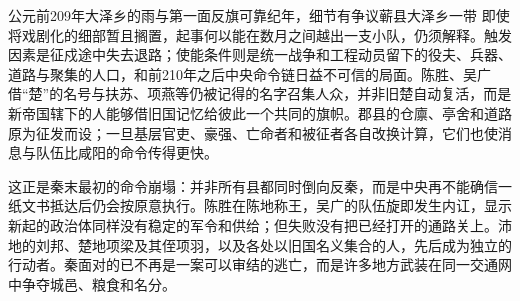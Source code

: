\begin{event}{公元前209年}{大泽乡的雨与第一面反旗}{可靠纪年，细节有争议}{蕲县大泽乡一带}
即使将戏剧化的细部暂且搁置，起事何以能在数月之间越出一支小队，仍须解释。触发因素是征戍途中失去退路；使能条件则是统一战争和工程动员留下的役夫、兵器、道路与聚集的人口，和前210年之后中央命令链日益不可信的局面。陈胜、吴广借“楚”的名号与扶苏、项燕等仍被记得的名字召集人众，并非旧楚自动复活，而是新帝国辖下的人能够借旧国记忆给彼此一个共同的旗帜。郡县的仓廪、亭舍和道路原为征发而设；一旦基层官吏、豪强、亡命者和被征者各自改换计算，它们也使消息与队伍比咸阳的命令传得更快。

这正是秦末最初的命令崩塌：并非所有县都同时倒向反秦，而是中央再不能确信一纸文书抵达后仍会按原意执行。陈胜在陈地称王，吴广的队伍旋即发生内讧，显示新起的政治体同样没有稳定的军令和供给；但失败没有把已经打开的通路关上。沛地的刘邦、楚地项梁及其侄项羽，以及各处以旧国名义集合的人，先后成为独立的行动者。秦面对的已不再是一案可以审结的逃亡，而是许多地方武装在同一交通网中争夺城邑、粮食和名分。
\end{event}

